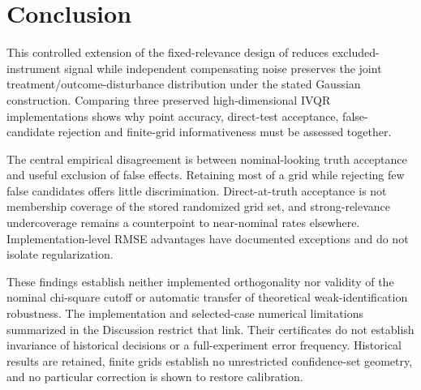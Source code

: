 \section{Conclusion}
This controlled extension of the fixed-relevance design of \textcite{chen_huang_tien_2021} reduces excluded-instrument signal while independent compensating noise preserves the joint treatment/outcome-disturbance distribution under the stated Gaussian construction. Comparing three preserved high-dimensional IVQR implementations shows why point accuracy, direct-test acceptance, false-candidate rejection and finite-grid informativeness must be assessed together.

The central empirical disagreement is between nominal-looking truth acceptance and useful exclusion of false effects. Retaining most of a grid while rejecting few false candidates offers little discrimination. Direct-at-truth acceptance is not membership coverage of the stored randomized grid set, and strong-relevance undercoverage remains a counterpoint to near-nominal rates elsewhere. Implementation-level RMSE advantages have documented exceptions and do not isolate regularization.

These findings establish neither implemented orthogonality nor validity of the nominal chi-square cutoff or automatic transfer of theoretical weak-identification robustness. The implementation and selected-case numerical limitations summarized in the Discussion restrict that link. Their certificates do not establish invariance of historical decisions or a full-experiment error frequency. Historical results are retained, finite grids establish no unrestricted confidence-set geometry, and no particular correction is shown to restore calibration.
